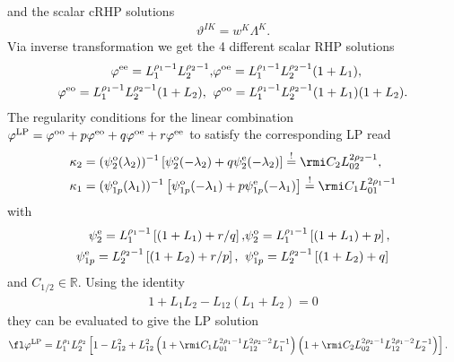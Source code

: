 \documentclass[12pt]{iopart}
\begin{document}
and the scalar cRHP solutions 
\begin{eqnarray}
\vartheta^{IK}=w^K\Lambda^K.
\end{eqnarray} 
Via inverse transformation we get the 4 different scalar RHP solutions
\begin{eqnarray}
\varphi^{\rm{ee}}=L_1^{\rho_1-1}L_2^{\rho_2-1}, &
\varphi^{\rm{oe}}=L_1^{\rho_1-1}L_2^{\rho_2-1}(1+L_1), \\
\varphi^{\rm{eo}}=L_1^{\rho_1-1}L_2^{\rho_2-1}(1+L_2), \;\;&
\varphi^{\rm{oo}}=L_1^{\rho_1-1}L_2^{\rho_2-1}(1+L_1)(1+L_2).
\end{eqnarray}
The regularity conditions for the linear combination $\varphi^{\rm{LP}}=\varphi^{\rm{oo}}+p\varphi^{\rm{eo}}+q\varphi^{\rm{oe}}+r\varphi^{\rm{ee}}$ to satisfy the corresponding LP read 
\begin{eqnarray}
\kappa_2&=(\psi_{2}^{\rm o}(\lambda_2))^{-1} \left[\psi_{2}^{\rm o}(-\lambda_2)+q\psi_{2}^{\rm e}(-\lambda_2)\right]\overset{!}{=}\rmi C_2 L_{02}^{2\rho_2-1}, \\
\kappa_1&=(\psi_{1p}^{\rm o}(\lambda_1))^{-1} \left[\psi_{1p}^{\rm o}(-\lambda_1)+p\psi_{1p}^{\rm e}(-\lambda_1)\right]\overset{!}{=}\rmi C_1 L_{01}^{2\rho_1-1}
\end{eqnarray}
with
\begin{eqnarray}
\psi_2^{\rm e}=L_1^{\rho_1-1}\left[(1+L_1) +r/q\right], &
\psi_2^{\rm o}=L_1^{\rho_1-1}\left[(1+L_1) +p\right], \\
\psi_{1p}^{\rm e}=L_2^{\rho_2-1}\left[(1+L_2) +r/p\right],\;\; &
\psi_{1p}^{\rm o}=L_2^{\rho_2-1}\left[(1+L_2) +q\right] \label{psiHilf}
\end{eqnarray}
and $C_{1/2}\in\mathbb{R}$. Using the identity
\begin{eqnarray}
1+L_1L_2-L_{12}(L_1+L_2)=0 \label{LIdentität}
\end{eqnarray}
they can be evaluated to give the LP solution
\begin{eqnarray}
\fl\varphi^{\rm LP}%
      &=L_1^{\rho_1} L_2^{\rho_2}\left[1-L_{12}^2+L_{12}^2\left(1+\rmi C_1 L_{01}^{2 \rho_1-1} L_{12}^{2 \rho_2-2}L_1^{-1}\right) \left(1+\rmi C_2 L_{02}^{2 \rho_2-1} L_{12}^{2\rho_1-2}L_2^{-1}\right)\right].  
\label{phiAllgSzek}
\end{eqnarray}
\end{document}
